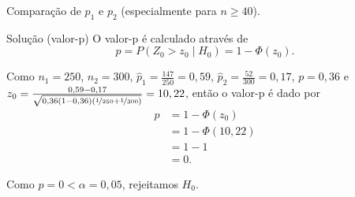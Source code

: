 \documentclass[9pt]{beamer}
\begin{document}
\begin{frame}{Comparação de $p_1$ e $p_2$ (especialmente para $n 
	\geq 40$).}

\begin{block}{Solução (valor-p)}
	O valor-p é calculado através de 
	$$p = P \left( Z_0 > z_0 \mid H_0 \right) = 1 - \Phi \left( z_0 \right).$$
	
	Como $n_1=250$, $n_2=300$, $\hat{p}_1 = \frac{147}{250} = 0,59$, $\hat{p}_2 = \frac{52}{300} = 0,17$, $p = 0,36$ e $z_0 = \frac{0,59 - 0,17}{\sqrt{0,36(1 - 0,36) \left( \nicefrac{1}{250} + \nicefrac{1}{300} \right)}} = 10,22$, então o valor-p é dado por
	\begin{align*}
		p &= 1 - \Phi\left(z_0\right)\\
		&= 1 - \Phi\left(10,22\right)\\
		& = 1 -1\\
		&= 0.
	\end{align*}
	
	Como $p = 0 < \alpha = 0,05$, rejeitamos $H_0$.
\end{block}

\end{frame}
\end{document}

